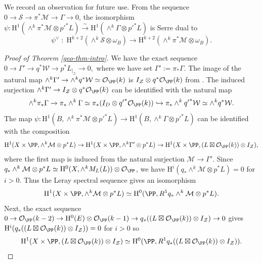 We record an observation for future use. From the sequence $0 \to \mathcal{S} \to \pi^* \mathcal{M} \to \Gamma \to 0$, the isomorphism $\psi: \mathrm{H}^1( \wedge^k \pi^* \mathcal{M} \otimes {p'}^*L) \xrightarrow{\sim} \mathrm{H}^1(\wedge^k \Gamma \otimes {p'}^*L)$ is Serre dual to
$$\psi^{\vee} \; : \; \mathrm{H}^{k+2}( \wedge^k \mathcal{S} \otimes \omega_B) \to \mathrm{H}^{k+2}( \wedge^k \pi^* \mathcal{M}\otimes \omega_B).$$
\begin{proof}[Proof of Theorem \ref{geo-thm-intro}]
We have the exact sequence $0 \to \Gamma' \to q^* \mathcal{W} \to p^*L_{|_{\mathcal{Z}}} \to 0,$ where we have set $\Gamma':=\pi_* \Gamma$. The image of the natural map $\wedge^k \Gamma' \to \wedge^k q^* \mathcal{W}  \simeq \mathcal{O}_{\PP}(k)$ is $I_{\mathcal{Z}} \otimes q^*\mathcal{O}_{\PP}(k)$ from \cite[Cor.\ 3.7]{ein-lazarsfeld-asymptotic}. The induced surjection $\wedge^k \Gamma' \to I_{\mathcal{Z}} \otimes q^*\mathcal{O}_{\PP}(k)$ can be identified with the natural map
$$\wedge^k \pi_* \Gamma \to \pi_*\wedge^k \Gamma \simeq \pi_*(I_D \otimes {q'}^*\mathcal{O}_{\PP}(k)) \hookrightarrow \pi_* \wedge^k {q'}^* \mathcal{W} \simeq \wedge^k q^* \mathcal{W} . $$ The map $\psi: \mathrm{H}^1(B, \wedge^k \pi^* \mathcal{M} \otimes {p'}^*L) \to \mathrm{H}^1(B, \wedge^k \Gamma \otimes {p'}^*L)$ can be identified with the composition
$$\mathrm{H}^1(X\times \PP, \wedge^k\mathcal{M} \otimes p^*L) \to \mathrm{H}^1(X\times \PP, \wedge^k \Gamma' \otimes p^*L) \to \mathrm{H}^1( X\times \PP, (L \boxtimes \mathcal{O}_{\PP}(k))\otimes I_{\mathcal{Z}}),$$
where the first map is induced from the natural surjection $\mathcal{M} \to \Gamma'$. Since $q_*\wedge^k\mathcal{M} \otimes p^*L \simeq \mathrm{H}^0(X, \wedge^k M_L(L)) \otimes \mathcal{O}_{\PP}$, we have $\mathrm{H}^i(q_*\wedge^k\mathcal{M} \otimes p^*L)=0$ for $i>0$. Thus the Leray spectral sequence gives an isomorphism
$$\mathrm{H}^1(X \times \PP, \wedge^k\mathcal{M} \otimes p^*L) \simeq \mathrm{H}^0(\PP, R^1q_*\wedge^k\mathcal{M} \otimes p^*L).$$
Next, the exact sequence $0 \to \mathcal{O}_{\PP}(k-2) \to \mathrm{H}^0(E) \otimes \mathcal{O}_{\PP}(k-1) \to q_*((L \boxtimes \mathcal{O}_{\PP}(k))\otimes I_{\mathcal{Z}}) \to 0$ gives $\mathrm{H}^i(q_*((L \boxtimes \mathcal{O}_{\PP}(k))\otimes I_{\mathcal{Z}}))=0$ for $i >0$ so
$$\mathrm{H}^1( X \times \PP,(L \boxtimes \mathcal{O}_{\PP}(k))\otimes I_{\mathcal{Z}})\simeq \mathrm{H}^0(\PP, R^1 q_*((L \boxtimes \mathcal{O}_{\PP}(k))\otimes I_{\mathcal{Z}})).$$

\end{proof}

